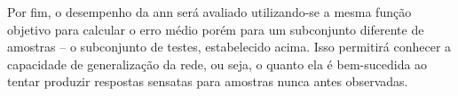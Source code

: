 

Por fim, o desempenho da \acrshort{ann} será avaliado utilizando-se a mesma função objetivo para calcular o erro médio porém para um subconjunto diferente de amostras -- o subconjunto de testes, estabelecido acima.
Isso permitirá conhecer a capacidade de generalização da rede, ou seja, o quanto ela é bem-sucedida ao tentar produzir respostas sensatas para amostras nunca antes observadas.



